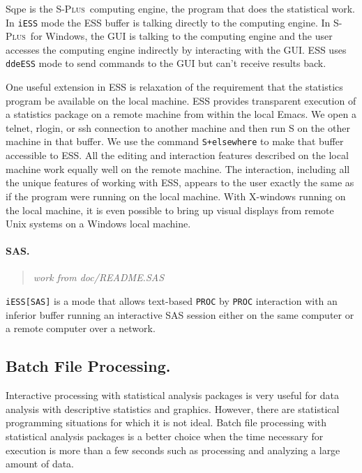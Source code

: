\documentclass{article}
\newcommand*{\Splus}{\textsc{S-Plus}}
\newcommand{\stexttt}[1]{{\small\texttt{#1}}}
\newcommand{\file}[1]{`\stexttt{#1}'}
\newenvironment{Comment}{\begin{quote}\small\itshape }{\end{quote}}
\begin{document}
Sqpe is the \Splus\ computing engine, the program that does the
statistical work.  In \stexttt{iESS} mode the ESS buffer is talking
directly to the computing engine.  In \Splus\ for Windows, the GUI is
talking to the computing engine and the user accesses the computing
engine indirectly by interacting with the GUI.  ESS uses
\stexttt{ddeESS} mode to send commands to the GUI but can't receive
results back.

One useful extension in ESS is relaxation of the requirement that the
statistics program be available on the local machine.  ESS provides
transparent execution of a statistics package on a remote machine from
within the local Emacs.  We open a telnet,
rlogin, or ssh connection to another machine
and then run S on the other machine in that buffer.  
We use the command \stexttt{S+elsewhere} to make that buffer accessible to ESS.
All the editing and interaction features described on
the local machine work equally well on the remote machine.
The interaction,
including all the unique features of working with ESS, appears to the
user exactly the same as if the program were running on the local
machine.  With X-windows running on the local machine, it is even
possible to bring up visual displays from remote Unix systems on a
Windows local machine.


\paragraph{SAS.}

\begin{Comment} work from doc/README.SAS \end{Comment}
\stexttt{iESS[SAS]} is a mode that allows text-based \stexttt{PROC} by
\stexttt{PROC} interaction with an inferior buffer running an interactive SAS
session either on the same computer or a remote computer over a network.


\subsection{Batch File Processing.}
\label{sec:batch-file}

Interactive processing with statistical analysis packages is very
useful for data analysis with descriptive statistics and graphics.
However, there are statistical programming situations for which it
is not ideal.  Batch file processing with statistical analysis
packages is a better choice when the time necessary for execution
is more than a few seconds such as processing and analyzing a
large amount of data.
\end{document}
